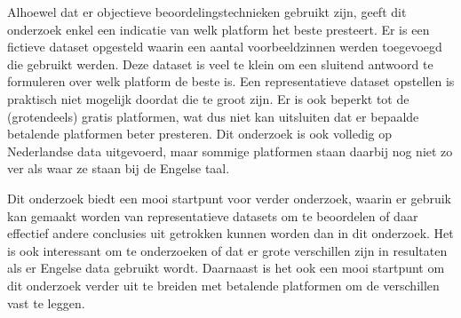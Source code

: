 Alhoewel dat er objectieve beoordelingstechnieken gebruikt zijn, geeft dit onderzoek enkel een indicatie van welk platform het beste presteert. Er is een fictieve dataset opgesteld waarin een aantal voorbeeldzinnen werden toegevoegd die gebruikt werden. Deze dataset is veel te klein om een sluitend antwoord te formuleren over welk platform de beste is. Een representatieve dataset opstellen is praktisch niet mogelijk doordat die te groot zijn. Er is ook beperkt tot de (grotendeels) gratis platformen, wat dus niet kan uitsluiten dat er bepaalde betalende platformen beter presteren. Dit onderzoek is ook volledig op Nederlandse data uitgevoerd, maar sommige platformen staan daarbij nog niet zo ver als waar ze staan bij de Engelse taal.

Dit onderzoek biedt een mooi startpunt voor verder onderzoek, waarin er gebruik kan gemaakt worden van representatieve datasets om te beoordelen of daar effectief andere conclusies uit getrokken kunnen worden dan in dit onderzoek. Het is ook interessant om te onderzoeken of dat er grote verschillen zijn in resultaten als er Engelse data gebruikt wordt. Daarnaast is het ook een mooi startpunt om dit onderzoek verder uit te breiden met betalende platformen om de verschillen vast te leggen.


